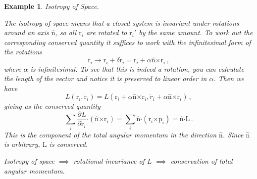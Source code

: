 \documentclass{article}
\theoremstyle{plain}\theoremheaderfont{\normalfont\itshape}\theorembodyfont{\rmfamily}\theoremseparator{.}\newtheorem*{rem}{Remark}\newtheorem*{ex}{Example}\newtheorem*{proof}{Proof}\newtheorem*{altp}{Alternative proof}
\theoremstyle{plain}\theoremheaderfont{\normalfont\bfseries}\theorembodyfont{\rmfamily}\theoremseparator{.}\newtheorem{thm}{Theorem}[section]\newtheorem{lem}[thm]{Lemma}\newtheorem{prop}[thm]{Proposition}\newtheorem*{cor}{Corollary}\newtheorem{defn}[thm]{Definition}\newtheorem{clm}[thm]{Claim}\newtheorem{clminproof}{Claim}\newtheorem{alg}[thm]{Algorithm}\newtheorem{hyp}[thm]{Hypothesis}\newtheorem{law}[thm]{Law}
\theoremstyle{break}\theoremheaderfont{\normalfont\itshape}\theorembodyfont{\rmfamily}\theoremseparator{.\medskip}\newtheorem*{proofskip}{Proof}\newtheorem*{exs}{Examples}\newtheorem*{rems}{Remarks}
\theoremstyle{break}\theoremheaderfont{\normalfont\bfseries}\theorembodyfont{\rmfamily}\theoremseparator{.\medskip}\newtheorem{lemskip}[thm]{Lemma}\newtheorem{defnskip}[thm]{Definition}\newtheorem{propskip}[thm]{Proposition}\newtheorem{thmskip}[thm]{Theorem}
\numberwithin{equation}{section}
\newcommand{\pdv}[3][]{\frac{\partial^{#1} #2}{{\partial #3}^{#1}}}
\newcommand{\vb}[1]{\bm{\mathrm{#1}}}
\newcommand{\vu}[1]{\hat{\bm{\mathrm{#1}}}}
\newcommand{\cross}{\bm{\times}}
\newcommand{\vdot}{\bm{\cdot}}
\begin{document}
    \begin{ex}
        \textit{Isotropy of Space}.

        The isotropy of space means that a closed system is invariant under rotations around an axis \(\vu{n}\), so all \(\vb{r}_i\) are rotated to \(\vb{r}_i'\) by the same amount. To work out the corresponding conserved quantity it suffices to work with the infinitesimal form of the rotations
        \begin{equation}
            \vb{r}_i\longrightarrow \vb{r}_i+\delta\vb{r}_i=\vb{r}_i+\alpha\vu{n}\cross\vb{r}_i\,,
        \end{equation}
        where \(\alpha\) is infinitesimal. To see that this is indeed a rotation, you can calculate the length of the vector and notice it is preserved to linear order in \(\alpha\). Then we have
        \begin{equation}
            L(\vb{r}_i,\dot{\vb{r}}_i)=L(\vb{r}_i+\alpha\vu{n}\cross\vb{r}_i,\dot{r}_i+\alpha\vu{n}\cross\dot{\vb{r}}_i)\,,
        \end{equation}
        giving us the conserved quantity
        \begin{equation}
            \sum_i\pdv{L}{\dot{\vb{r}}_i}\vdot(\vu{n}\cross\vb{r}_i)=\sum_i\vu{n}\vdot(\vb{r}_i\cross\vb{p}_i)=\vu{n}\vdot\vb{L}\,.
        \end{equation}
        This is the component of the total angular momentum in the direction \(\vu{n}\). Since \(\vu{n}\) is arbitrary, \(\vb{L}\) is conserved.

        Isotropy of space \(\implies\) rotational invariance of \(L\) \(\implies\) conservation of total angular momentum.
    \end{ex}
    
\end{document}
